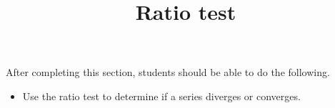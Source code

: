 \documentclass{ximera}
\title{Ratio test}
\begin{document}
\begin{abstract}
\end{abstract}

\maketitle

\begin{sectionOutcomes}

After completing this section, students should be able to do the following.

\begin{itemize}
\item Use the ratio test to determine if a series diverges or converges.
\end{itemize}

\end{sectionOutcomes}
\end{document}
